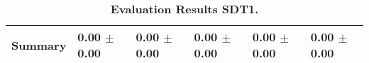 \begin{table}[htb]
{\begin{tabular}{llllll}
\midrule
\textbf{Summary                                  } &  \phantom{0}0.00 $\pm$ \phantom{0}0.00 &             \phantom{0}0.00 $\pm$ \phantom{0}0.00 &  \phantom{0}0.00 $\pm$ \phantom{0}0.00 &  \phantom{0}0.00 $\pm$ \phantom{0}0.00 &  \phantom{0}0.00 $\pm$ \phantom{0}0.00 \\
\bottomrule
\end{tabular}%
}
\caption{\textbf{Evaluation Results SDT1.}}
\label{tab:eval-results}
\end{table}


